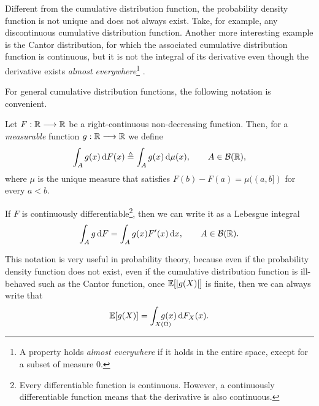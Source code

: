 Different from the cumulative distribution function, the probability density function is not unique and does not always exist.
%
Take, for example, any discontinuous cumulative distribution function. Another more interesting example is the Cantor distribution, for which the associated cumulative distribution function is continuous, but it is not the integral of its derivative even though the derivative exists \textit{almost everywhere}\footnote{A property holds \textit{almost everywhere} if it holds in the entire space, except for a subset of measure $0$.} \cite{cantor1884puissance}.

For general cumulative distribution functions, the following notation is convenient.

\begin{definition} \label{def:lebesgue-stieltjes}
    Let $F: {\mathbb R} \longrightarrow {\mathbb R}$ be a right-continuous non-decreasing function. Then, for a \textit{measurable} function $g:{\mathbb R}\longrightarrow {\mathbb R}$ we define \vspace{-5mm}
    \begin{align*}
        \int_A g(x)\,\mathrm{d} F(x) \triangleq \int_A g(x)\,\mathrm{d}\mu(x), \qquad A\in\mathcal{B}({\mathbb R}),
    \end{align*}
    where $\mu$ is the unique measure that satisfies $F(b)-F(a) = \mu((a,b])$ for every $a<b$.
\end{definition}

If $F$ is continuously differentiable\footnote{Every differentiable function is continuous. However, a continuously differentiable function means that the derivative is also continuous.}, then we can write it as a Lebesgue integral
\begin{align*}
    \int_A g \,\mathrm{d} F = \int_A g(x) F'(x) \,\mathrm{d} x, \qquad A\in\mathcal{B}({\mathbb R}).
\end{align*}

\begin{remark}
    This notation is very useful in probability theory, because even if the probability density function does not exist, even if the cumulative distribution function is ill-behaved such as the Cantor function, once ${\mathbb E}[|g(X)|]$ is finite, then we can always write that \vspace{-5mm}
    \begin{align*}
        \E[g(X)] = \int_{X(\Omega)}\hspace{-5mm} g(x)\,\d F_X(x).
    \end{align*}
\end{remark}

